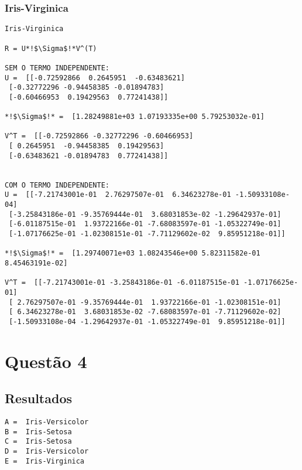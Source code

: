 \documentclass[a4paper,12pt,twoside]{article}
\begin{document}
\subsubsection{Iris-Virginica}
\begin{lstlisting}
Iris-Virginica

R = U*!$\Sigma$!*V^(T)

SEM O TERMO INDEPENDENTE: 
U =  [[-0.72592866  0.2645951  -0.63483621]
 [-0.32772296 -0.94458385 -0.01894783]
 [-0.60466953  0.19429563  0.77241438]]

*!$\Sigma$!* =  [1.28249881e+03 1.07193335e+00 5.79253032e-01]

V^T =  [[-0.72592866 -0.32772296 -0.60466953]
 [ 0.2645951  -0.94458385  0.19429563]
 [-0.63483621 -0.01894783  0.77241438]]


COM O TERMO INDEPENDENTE: 
U =  [[-7.21743001e-01  2.76297507e-01  6.34623278e-01 -1.50933108e-04]
 [-3.25843186e-01 -9.35769444e-01  3.68031853e-02 -1.29642937e-01]
 [-6.01187515e-01  1.93722166e-01 -7.68083597e-01 -1.05322749e-01]
 [-1.07176625e-01 -1.02308151e-01 -7.71129602e-02  9.85951218e-01]]

*!$\Sigma$!* =  [1.29740071e+03 1.08243546e+00 5.82311582e-01 8.45463191e-02]

V^T =  [[-7.21743001e-01 -3.25843186e-01 -6.01187515e-01 -1.07176625e-01]
 [ 2.76297507e-01 -9.35769444e-01  1.93722166e-01 -1.02308151e-01]
 [ 6.34623278e-01  3.68031853e-02 -7.68083597e-01 -7.71129602e-02]
 [-1.50933108e-04 -1.29642937e-01 -1.05322749e-01  9.85951218e-01]]
\end{lstlisting}

\section{Questão 4}
\subsection{Resultados}
\begin{lstlisting}
A =  Iris-Versicolor
B =  Iris-Setosa
C =  Iris-Setosa
D =  Iris-Versicolor
E =  Iris-Virginica
\end{lstlisting}
\end{document}
